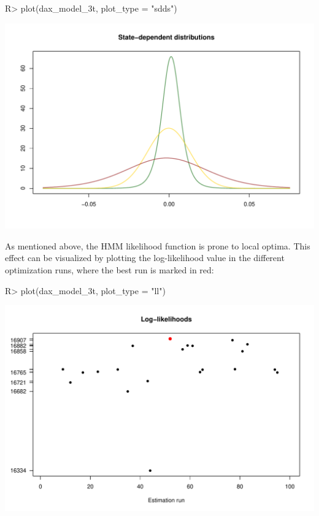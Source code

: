 \documentclass[article]{jss}
\begin{document}
%
\begin{Schunk}
\begin{Sinput}
R> plot(dax_model_3t, plot_type = "sdds")
\end{Sinput}
\end{Schunk}
\includegraphics{fhmm_oelschlaeger_adam_michels-sdds}
%

As mentioned above, the HMM likelihood function is prone to local optima. This effect can be visualized by plotting the log-likelihood value in the different optimization runs, where the best run is marked in red:

%
\begin{Schunk}
\begin{Sinput}
R> plot(dax_model_3t, plot_type = "ll")
\end{Sinput}
\end{Schunk}
\includegraphics{fhmm_oelschlaeger_adam_michels-ll}
%
\end{document}
